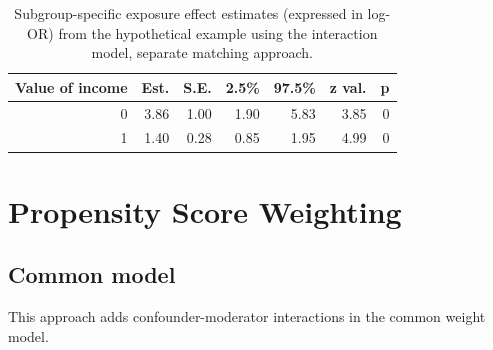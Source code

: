 \documentclass[
  letterpaper,
  DIV=11,
  numbers=noendperiod]{scrreprt}
\newenvironment{Shaded}{\begin{snugshade}}{\end{snugshade}}
\newcommand{\AttributeTok}[1]{\textcolor[rgb]{0.40,0.45,0.13}{#1}}
\newcommand{\ConstantTok}[1]{\textcolor[rgb]{0.56,0.35,0.01}{#1}}
\newcommand{\DecValTok}[1]{\textcolor[rgb]{0.68,0.00,0.00}{#1}}
\newcommand{\FunctionTok}[1]{\textcolor[rgb]{0.28,0.35,0.67}{#1}}
\newcommand{\NormalTok}[1]{\textcolor[rgb]{0.00,0.23,0.31}{#1}}
\newcommand{\OtherTok}[1]{\textcolor[rgb]{0.00,0.23,0.31}{#1}}
\newcommand{\SpecialCharTok}[1]{\textcolor[rgb]{0.37,0.37,0.37}{#1}}
\newcommand{\StringTok}[1]{\textcolor[rgb]{0.13,0.47,0.30}{#1}}
\begin{document}
\hypertarget{tbl-ints-approach-sep}{}
\begin{table}[!h]
\caption{\label{tbl-ints-approach-sep}Subgroup-specific exposure effect estimates (expressed in log-OR) from
the hypothetical example using the interaction model, separate matching
approach. }\tabularnewline

\centering
\begin{tabular}{rrrrrrr}
\toprule
Value of income & Est. & S.E. & 2.5\% & 97.5\% & z val. & p\\
\midrule
0 & 3.86 & 1.00 & 1.90 & 5.83 & 3.85 & 0\\
1 & 1.40 & 0.28 & 0.85 & 1.95 & 4.99 & 0\\
\bottomrule
\end{tabular}
\end{table}

\hypertarget{propensity-score-weighting-1}{%
\section{Propensity Score
Weighting}\label{propensity-score-weighting-1}}

\hypertarget{common-model}{%
\subsection{Common model}\label{common-model}}

This approach adds confounder-moderator interactions in the common
weight model.

\begin{Shaded}
\end{Shaded}
\end{document}
